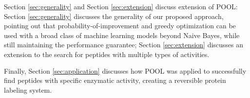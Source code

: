 Section \ref{sec:generality} and Section \ref{sec:extension} discuss extension of POOL: Section \ref{sec:generality} discusses the generality of our proposed approach, pointing out that probability-of-improvement and greedy optimization can be used with a broad class of machine learning models beyond Naive Bayes, while still maintaining the performance guarantee; Section \ref{sec:extension} discusses an extension to the search for peptides with multiple types of activities. 

Finally, Section \ref{sec:application} discusses how POOL was applied to successfully find peptides with specific enzymatic activity, creating a reversible protein labeling system. 